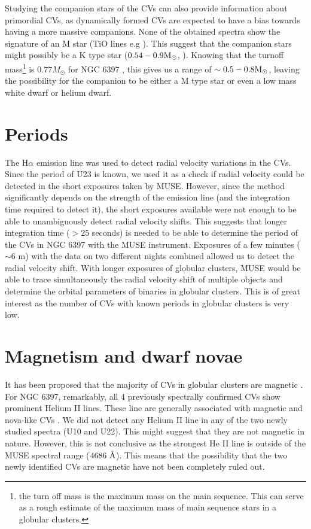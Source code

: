 Studying the companion stars of the CVs can also provide information about primordial CVs, as dynamically formed CVs are expected to have a bias towards having a more massive companions. None of the obtained spectra show the signature of an M star (TiO lines e.g \citealt{Marsh_secondary_1990}). This suggest that the companion stars might possibly be a K type star ($0.54 - 0.9 \text M _\odot$, \citealt{gray2005observation}). Knowing that the turnoff mass\footnote{the turn off mass is the maximum mass on the main sequence. This can serve as a rough estimate of the maximum mass of main sequence stars in a globular clusters.} is $0.77 M_\odot$ for NGC 6397 \citep{de_marco_spectroscopic_2005}, this gives us a range of $\sim 0.5 - 0.8 \text M _\odot$, leaving the possibility for the companion to be either a M type star or even a low mass white dwarf or helium dwarf.

\section{Periods}

The H$\alpha$ emission line was used to detect radial velocity variations in the CVs. Since the period of U23 is known, we used it as a check if radial velocity could be detected in the short exposures taken by MUSE. However, since the method significantly depends on the strength of the emission line (and the integration time required to detect it), the short exposures available were not enough to be able to unambiguously detect radial velocity shifts. This suggests that longer integration time ($> 25$ seconds) is needed to be able to determine the period of the CVs in NGC 6397 with the MUSE instrument. Exposures of a few minutes ($\sim 6 \text{ m}$) with the data on two different nights combined allowed us to detect the radial velocity shift. With longer exposures of globular clusters, MUSE would be able to trace simultaneously the radial velocity shift of multiple objects and determine the orbital parameters of binaries in globular clusters. This is of great interest as the number of CVs with known periods in globular clusters is very low.  

\section{Magnetism and dwarf novae}

It has been proposed that the majority of CVs in globular clusters are magnetic \citep{grindlay_magnetic_1999}. For NGC 6397, remarkably, all 4 previously spectrally confirmed CVs show prominent Helium II lines. These line are generally associated with magnetic and nova-like CVs \citep{echevarria_statistical_1988}. We did not detect any Helium II line in any of the two newly studied spectra (U10 and U22). This might suggest that they are not magnetic in nature. However, this is not conclusive as the strongest He II line is outside of the MUSE spectral range ($4686 \text{ \r A}$). This means that the possibility that the two newly identified CVs are magnetic have not been completely ruled out. 

